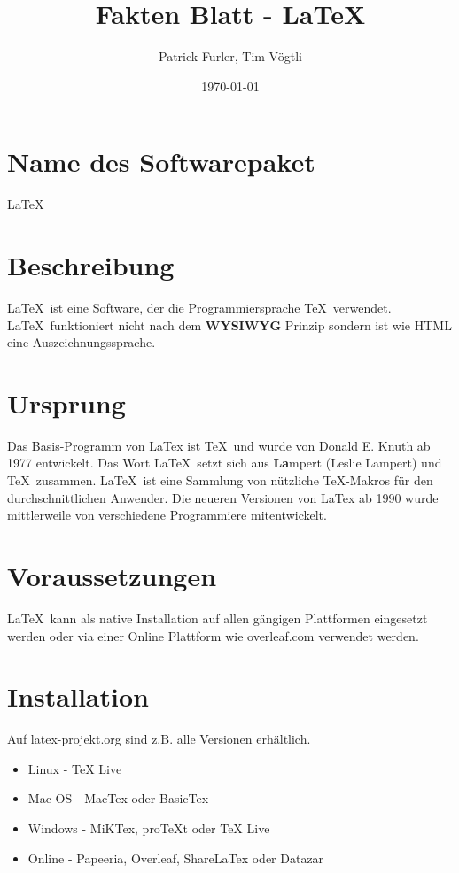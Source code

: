 \documentclass{article}
\title{Fakten Blatt - \LaTeX}					%
\author{Patrick Furler, Tim Vögtli}				%
\date{\today}									%
\begin{document}

\maketitle 										%
\thispagestyle{fancy}							%

\section{Name des Softwarepaket}
\LaTeX

\section{Beschreibung}
\LaTeX\ ist eine Software, der die Programmiersprache \TeX\ verwendet. \LaTeX\ funktioniert nicht nach dem \textbf{WYSIWYG} Prinzip sondern ist wie HTML eine Auszeichnungssprache.

\section{Ursprung}

Das Basis-Programm von LaTex ist \TeX\ und wurde von Donald E. Knuth ab 1977 entwickelt. Das Wort \LaTeX\ setzt sich aus \textbf{La}mpert (Leslie Lampert) und \TeX\ zusammen. \LaTeX\ ist eine Sammlung von nützliche \TeX-Makros für den durchschnittlichen Anwender. Die neueren Versionen von LaTex ab 1990 wurde mittlerweile von verschiedene Programmiere mitentwickelt.

\section{Voraussetzungen}

\LaTeX\ kann als native Installation auf allen gängigen Plattformen eingesetzt werden oder via einer Online Plattform wie overleaf.com verwendet werden.

\section{Installation}

Auf latex-projekt.org sind z.B. alle Versionen erhältlich.
\begin{itemize}
	\item Linux - TeX Live
	\item Mac OS - MacTex oder BasicTex
	\item Windows - MiKTex, proTeXt oder TeX Live
	\item Online - Papeeria, Overleaf, ShareLaTex oder Datazar
\end{itemize}
\end{document}
